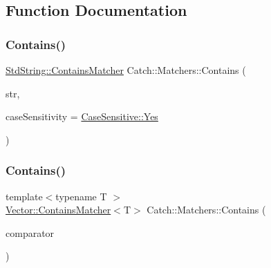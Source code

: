 \subsection{Function Documentation}
\mbox{\label{namespace_catch_1_1_matchers_a1f6c2accdc6cd75a84d7112dcad647b4}} 
\subsubsection{\texorpdfstring{Contains()}{Contains()}\hspace{0.1cm}{\footnotesize\ttfamily [1/2]}}
{\footnotesize\ttfamily \mbox{\hyperlink{struct_catch_1_1_matchers_1_1_std_string_1_1_contains_matcher}{Std\+String\+::\+Contains\+Matcher}} Catch\+::\+Matchers\+::\+Contains (\begin{DoxyParamCaption}\item[{std\+::string const \&}]{str,  }\item[{\mbox{\hyperlink{struct_catch_1_1_case_sensitive_aad49d3aee2d97066642fffa919685c6a}{Case\+Sensitive\+::\+Choice}}}]{case\+Sensitivity = {\ttfamily \mbox{\hyperlink{struct_catch_1_1_case_sensitive_aad49d3aee2d97066642fffa919685c6aa7c5550b69ec3c502e6f609b67f9613c6}{Case\+Sensitive\+::\+Yes}}} }\end{DoxyParamCaption})}

\mbox{\label{namespace_catch_1_1_matchers_a4b3621740dc515216ad31ab827d4092c}} 
\subsubsection{\texorpdfstring{Contains()}{Contains()}\hspace{0.1cm}{\footnotesize\ttfamily [2/2]}}
{\footnotesize\ttfamily template$<$typename T $>$ \\
\mbox{\hyperlink{struct_catch_1_1_matchers_1_1_vector_1_1_contains_matcher}{Vector\+::\+Contains\+Matcher}}$<$T$>$ Catch\+::\+Matchers\+::\+Contains (\begin{DoxyParamCaption}\item[{std\+::vector$<$ T $>$ const \&}]{comparator }\end{DoxyParamCaption})}

